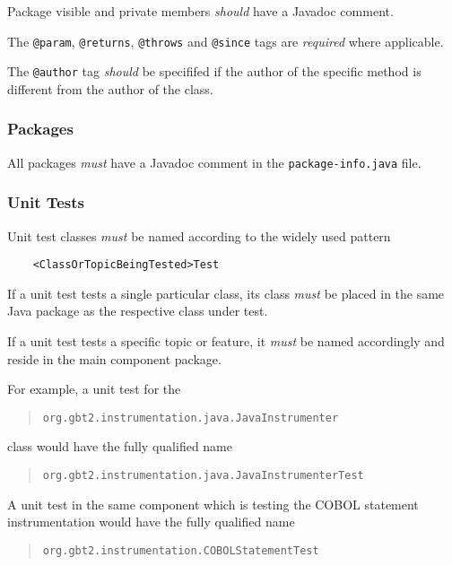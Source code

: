 \documentclass[a4paper,12pt,liststotoc,DIV12]{scrartcl}
\begin{document}
Package visible and private members \emph{should} have a Javadoc comment.

The \texttt{@param}, \texttt{@returns}, \texttt{@throws} and \texttt{@since}
tags are \emph{required} where applicable.

The \texttt{@author} tag \emph{should} be specififed if the author of the
specific method is different from the author of the class.

\subsubsection{Packages}
\label{sec:general:javadoc:packages}

All packages \emph{must} have a Javadoc comment in the
\texttt{package-info.java} file.

\subsubsection{Unit Tests}
\label{sec:unit-tests}

Unit test classes \emph{must} be named according to the widely used
pattern

\begin{verbatim}
    <ClassOrTopicBeingTested>Test
\end{verbatim}

If a unit test tests a single particular class, its class \emph{must}
be placed in the same Java package as the respective class under test.

If a unit test tests a specific topic or feature, it \emph{must} be named
accordingly and reside in the main component package.

For example, a unit test for the

\begin{quote}
  \texttt{org.gbt2.instrumentation.java.JavaInstrumenter}
\end{quote}

class would
have the fully qualified name

\begin{quote}
  \texttt{org.gbt2.instrumentation.java.JavaInstrumenterTest}
\end{quote}

A unit
test in the same component which is testing the COBOL statement
instrumentation would have the fully qualified name
\begin{quote}
  \texttt{org.gbt2.instrumentation.COBOLStatementTest}
\end{quote}
\end{document}
